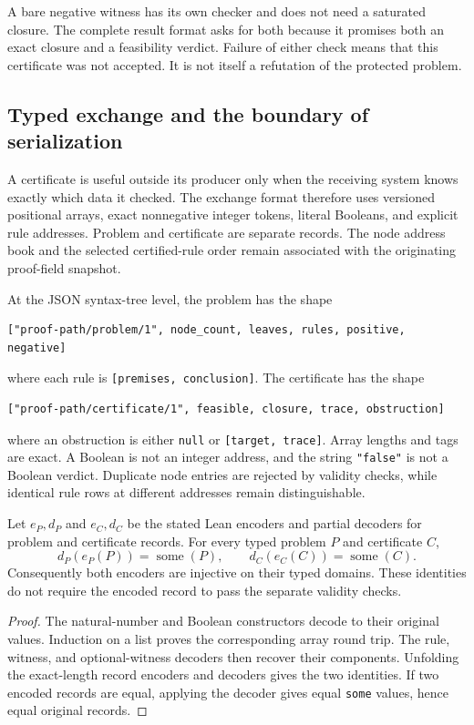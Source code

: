 A bare negative witness has its own checker and does not need a saturated closure. The complete result format asks for both because it promises both an exact closure and a feasibility verdict. Failure of either check means that this certificate was not accepted. It is not itself a refutation of the protected problem.

\subsection{Typed exchange and the boundary of serialization}
\label{sec:trace-wire}

A certificate is useful outside its producer only when the receiving system knows exactly which data it checked. The exchange format therefore uses versioned positional arrays, exact nonnegative integer tokens, literal Booleans, and explicit rule addresses. Problem and certificate are separate records. The node address book and the selected certified-rule order remain associated with the originating proof-field snapshot.

At the JSON syntax-tree level, the problem has the shape
\begin{lstlisting}[language={}]
["proof-path/problem/1", node_count, leaves, rules, positive, negative]
\end{lstlisting}
where each rule is \texttt{[premises, conclusion]}. The certificate has the shape
\begin{lstlisting}[language={}]
["proof-path/certificate/1", feasible, closure, trace, obstruction]
\end{lstlisting}
where an obstruction is either \texttt{null} or \texttt{[target, trace]}. Array lengths and tags are exact. A Boolean is not an integer address, and the string \texttt{"false"} is not a Boolean verdict. Duplicate node entries are rejected by validity checks, while identical rule rows at different addresses remain distinguishable.

\begin{theorem}
\label{res:trace:codec}
Let $e_P,d_P$ and $e_C,d_C$ be the stated Lean encoders and partial decoders for problem and certificate records. For every typed problem $P$ and certificate $C$,
\[
 d_P(e_P(P))=\operatorname{some}(P),\qquad
 d_C(e_C(C))=\operatorname{some}(C).
\]
Consequently both encoders are injective on their typed domains. These identities do not require the encoded record to pass the separate validity checks.
\end{theorem}
\begin{proof}
The natural-number and Boolean constructors decode to their original values. Induction on a list proves the corresponding array round trip. The rule, witness, and optional-witness decoders then recover their components. Unfolding the exact-length record encoders and decoders gives the two identities. If two encoded records are equal, applying the decoder gives equal \texttt{some} values, hence equal original records.
\end{proof}

